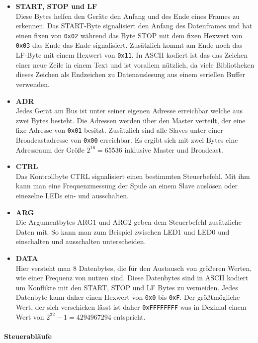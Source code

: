 \begin{itemize}
    \item \textbf{START, STOP und LF} \\
    Diese Bytes helfen den Geräte den Anfang und des Ende eines Frames zu erkennen. Das START-Byte signalisiert den Anfang des Datenframes und hat einen fixen von \texttt{0x02} während das Byte STOP mit dem 
    fixen Hexwert von \texttt{0x03} das Ende das Ende signalisiert. Zusätzlich kommt am Ende noch das LF-Byte mit einem Hexwert von \texttt{0x11}. In ASCII kodiert ist das das Zeichen einer neue Zeile in einem Text und ist vorallem nützlich, da
    viele Bibliotheken dieses Zeichen als Endzeichen zu Datenauslesung aus einem seriellen Buffer verwenden.
    \item \textbf{ADR} \\
    Jedes Gerät am Bus ist unter seiner eigenen Adresse erreichbar welche aus zwei Bytes besteht. Die Adressen werden über den Master verteilt, der eine fixe Adresse von \texttt{0x01} besitzt. 
    Zusätzlich sind alle Slaves unter einer Broadcastadresse von \texttt{0x00} erreichbar. Es ergibt sich mit zwei Bytes eine Adressraum der Größe $2^{16} = 65536$ inklusive Master und Broadcast.
    \item \textbf{CTRL} \\
    Das Kontrollbyte CTRL signalisiert einen bestimmten Steuerbefehl. Mit ihm kann man eine Frequenzmessung der Spule an einem Slave auslösen oder einezelne LEDs ein- und ausschalten.
    
    \item \textbf{ARG} \\
    Die Argumentbytes ARG1 und ARG2 geben dem Steuerbefehl zusätzliche Daten mit. 
    So kann man zum Beispiel zwischen LED1 und LED0 und einschalten und ausschalten unterscheiden. 
    
    \item \textbf{DATA} \\
    Hier versteht man 8 Datenbytes, die für den Austausch von größeren Werten, wie einer Frequenz von nutzen sind. Diese Datenbytes sind in ASCII kodiert um Konflikte mit den START, STOP und LF Bytes zu vermeiden. Jedes Datenbyte kann daher einen Hexwert von \texttt{0x0} bis 
    \texttt{0xF}. Der größtmögliche Wert, der sich verschicken lässt ist daher \texttt{0xFFFFFFFF} was in Dezimal einem Wert von $2^{32} - 1 = 4 294 967 294$ entspricht.
\end{itemize}

\paragraph{Steuerabläufe}\mbox{}

